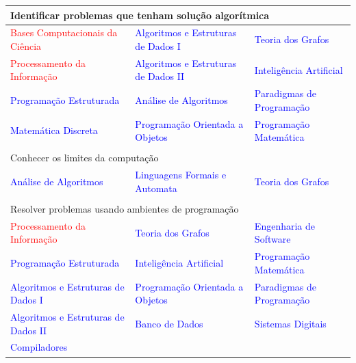 \documentclass{article}
\begin{document}
\begin{longtable}{|p{}p{}p{}|}
	\multicolumn{3}{l}{Identificar problemas que tenham solução algorítmica}\\
	\hline
	\textcolor{red}{Bases Computacionais da Ciência}  & \textcolor{blue}{Algoritmos e Estruturas de Dados I} & \textcolor{blue}{Teoria dos Grafos}\\
	\textcolor{red}{Processamento da Informação} & \textcolor{blue}{Algoritmos e Estruturas de Dados II} & \textcolor{blue}{Inteligência Artificial}\\
	\textcolor{blue}{Programação Estruturada} & \textcolor{blue}{Análise de Algoritmos} & \textcolor{blue}{Paradigmas de Programação}\\
	\textcolor{blue}{Matemática Discreta} & \textcolor{blue}{Programação Orientada a Objetos} & \textcolor{blue}{Programação Matemática}\\
	\hline
	
	\multicolumn{3}{l}{}\\
	
	\multicolumn{3}{l}{Conhecer os limites da computação}\\
	\hline
	\textcolor{blue}{Análise de Algoritmos} & \textcolor{blue}{Linguagens Formais e Automata} & \textcolor{blue}{Teoria dos Grafos}\\
	\hline
	
	\multicolumn{3}{l}{}\\
	\multicolumn{3}{l}{Resolver problemas usando ambientes de programação}\\
	\hline
	\textcolor{red}{Processamento da Informação} &  \textcolor{blue}{Teoria dos Grafos} & \textcolor{blue}{Engenharia de Software}\\
	\textcolor{blue}{Programação Estruturada} &  \textcolor{blue}{Inteligência Artificial} &  \textcolor{blue}{Programação Matemática}\\
	\textcolor{blue}{Algoritmos e Estruturas de Dados I} & \textcolor{blue}{Programação Orientada a Objetos} & \textcolor{blue}{Paradigmas de Programação}\\
	\textcolor{blue}{Algoritmos e Estruturas de Dados II} & \textcolor{blue}{Banco de Dados} &  \textcolor{blue}{Sistemas Digitais}\\
	\textcolor{blue}{Compiladores} && \\
	\hline
	

\end{longtable}
\end{document}
